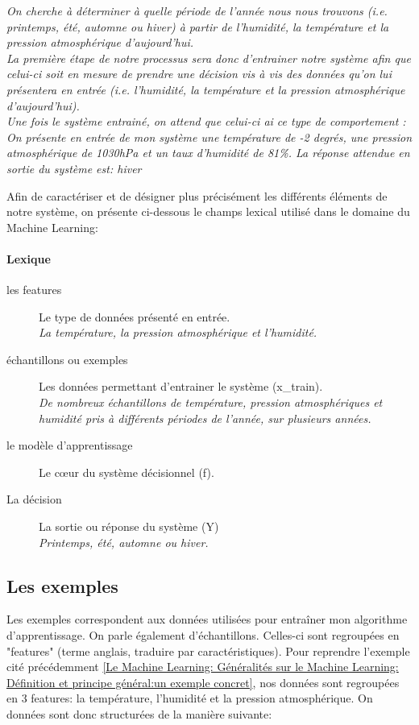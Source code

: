 \textit{On cherche à déterminer à quelle période de l'année nous nous trouvons (i.e. printemps, été, automne ou hiver) à partir de l'humidité, la température et la pression atmosphérique d'aujourd'hui. \\
	La première étape de notre processus sera donc d'entrainer notre système afin que celui-ci soit en mesure de prendre une décision vis à vis des données qu'on lui présentera en entrée (i.e. l'humidité, la température et la pression atmosphérique d'aujourd'hui). \\
	Une fois le système entrainé, on attend que celui-ci ai ce type de comportement : \\
	On présente en entrée de mon système une température de -2 degrés, une pression atmosphérique de 1030hPa et un taux d'humidité de 81\%. La réponse attendue en sortie du système est: hiver}

Afin de caractériser et de désigner plus précisément les différents éléments de notre système, on présente ci-dessous le champs lexical utilisé dans le domaine du Machine Learning:

\paragraph{Lexique} 
\begin{description}
	\item [les features] Le type de données présenté en entrée. \\
	\textit{La température, la pression atmosphérique et l'humidité.}
	\item [échantillons ou exemples] Les données permettant d'entrainer le système (x\_train). \\
	\textit{De nombreux échantillons de température, pression atmosphériques et humidité pris à différents périodes de l'année, sur plusieurs années.}
	\item [le modèle d'apprentissage] Le cœur du système décisionnel (f).
	\item [La décision] La sortie ou réponse du système (Y) \\
	\textit{Printemps, été, automne ou hiver.}
\end{description}

\subsection{Les exemples}
\label{Le Machine Learning: Généralités sur le Machine Learning: Les données}
Les exemples correspondent aux données utilisées pour entraîner mon algorithme d'apprentissage. On parle également d'échantillons. Celles-ci sont regroupées en "features" (terme anglais, traduire par caractéristiques). 
Pour reprendre l'exemple cité précédemment \ref{Le Machine Learning: Généralités sur le Machine Learning: Définition et principe général:un exemple concret}, nos données sont regroupées en 3 features: la température, l'humidité et la pression atmosphérique. On données sont donc structurées de la manière suivante: 

